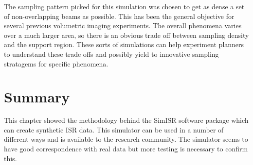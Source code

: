 The sampling pattern picked for this simulation was chosen to get as dense a set of non-overlapping beams as possible.  This has been the general objective for several previous volumetric imaging experiments.
The overall phenomena varies over a much larger area, so there is an obvious trade off between sampling density and the support region. These sorts of simulations can help experiment planners to understand these trade offs and possibly yield to innovative sampling stratagems for specific phenomena. 

\section{Summary}
This chapter showed the methodology behind the SimISR software package which can create synthetic ISR data. This simulator can be used in a number of different ways and is available to the research community. The simulator seems to have good correspondence with real data but more testing is necessary to confirm this. 
